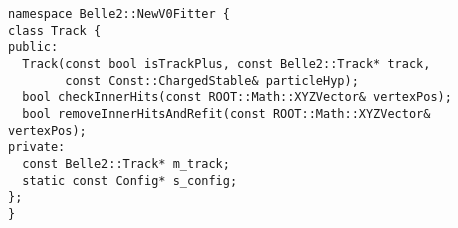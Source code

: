 \begin{verbatim}
namespace Belle2::NewV0Fitter {
class Track {
public:
  Track(const bool isTrackPlus, const Belle2::Track* track,
        const Const::ChargedStable& particleHyp);
  bool checkInnerHits(const ROOT::Math::XYZVector& vertexPos);
  bool removeInnerHitsAndRefit(const ROOT::Math::XYZVector& vertexPos);
private:
  const Belle2::Track* m_track;
  static const Config* s_config;
};
}
\end{verbatim}  